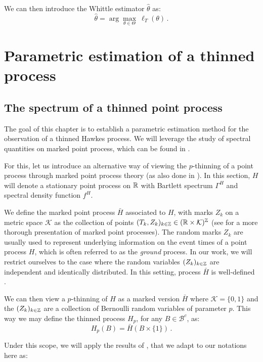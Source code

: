 We can then introduce the Whittle estimator $\hat \theta$ \parencite{Whittle1952} as:
\[\hat \theta = \arg\max_{\theta \in \Theta}~ \ell_T (\theta)\,.\]

\section{Parametric estimation of a thinned process}\label{sec:chap5_estimation}

    \subsection{The spectrum of a thinned point process}\label{sec:chap5_thinned_spectrum}

The goal of this chapter is to establish a parametric estimation method for the observation of a thinned Hawkes process.
We will leverage the study of spectral quantities on marked point process, 
which can be found in \textcite{Bremaud2002, Bremaud2005}. 

For this, let us introduce an alternative way of viewing the $p$-thinning of a point process through marked point process theory (as also done in \textcite{Cronie2023}).
In this section, $H$ will denote a stationary point process on ${\mathbb R}$ with Bartlett spectrum $\Gamma^H$ and spectral density function $f^H$.

We define the marked point process $\bar H$ associated to $H$, with marks $Z_k$ on a metric space $\mathcal{K}$ as the collection of points
$(T_k, Z_k)_{k\in{\mathbb Z}} \in ({\mathbb R} \times \mathcal{K})^{{\mathbb Z}}$ (see \textcite[Chapter 6.4]{DaleyV1} for a more thorough presentation of marked point processes). 
The random marks $Z_k$ are usually used to represent underlying information on the event times of a point process $H$, 
which is often referred to as the \textit{ground} process.
In our work, we will restrict ourselves to the case where the random variables $(Z_k)_{k\in{\mathbb Z}}$ are independent and identically distributed.
In this setting, process $\bar H$ is well-defined \parencite[6.4.IV(a)]{DaleyV1}.

We can then view a $p$-thinning of $H$ as a marked version $\bar H$ where $\mathcal{K} = \{0,1\}$
and the $(Z_k)_{k\in{\mathbb Z}}$ are a collection of Bernoulli random variables of parameter $p$.
This way we may define the thinned process $H_p$, for any $B\in\mathcal{B}^c$, as:
\[H_p(B) = \bar H(B\times\{1\})\,.\]

Under this scope, we will apply the results of \textcite{Bremaud2005}, 
that we adapt to our notations here as:

